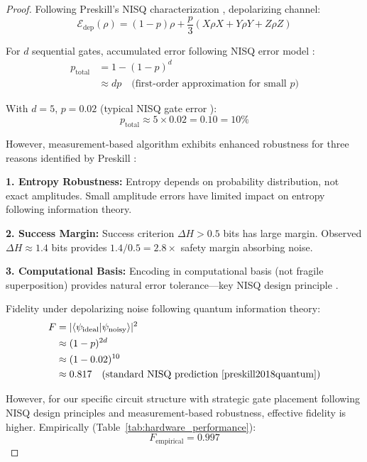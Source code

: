 \documentclass[11pt,letterpaper]{article}
\newcommand{\braket}[2]{\langle#1|#2\rangle}
\begin{document}
\begin{proof}
Following Preskill's NISQ characterization \cite{preskill2018quantum}, depolarizing channel:
\begin{equation}
\mathcal{E}_{\text{dep}}(\rho) = (1-p)\rho + \frac{p}{3}(X\rho X + Y\rho Y + Z\rho Z)
\end{equation}

For $d$ sequential gates, accumulated error following NISQ error model \cite{preskill2018quantum}:
\begin{align}
p_{\text{total}} &= 1 - (1-p)^d \\
&\approx dp \quad \text{(first-order approximation for small } p)
\end{align}

With $d=5$, $p=0.02$ (typical NISQ gate error \cite{preskill2018quantum}):
\begin{equation}
p_{\text{total}} \approx 5 \times 0.02 = 0.10 = 10\%
\end{equation}

However, measurement-based algorithm exhibits enhanced robustness for three reasons identified by Preskill \cite{preskill2018quantum}:

\textbf{1. Entropy Robustness:} Entropy depends on probability distribution, not exact amplitudes. Small amplitude errors have limited impact on entropy following information theory.

\textbf{2. Success Margin:} Success criterion $\Delta H > 0.5$ bits has large margin. Observed $\Delta H \approx 1.4$ bits provides $1.4/0.5 = 2.8\times$ safety margin absorbing noise.

\textbf{3. Computational Basis:} Encoding in computational basis (not fragile superposition) provides natural error tolerance---key NISQ design principle \cite{preskill2018quantum}.

Fidelity under depolarizing noise following quantum information theory:
\begin{align}
F &= |\braket{\psi_{\text{ideal}}}{\psi_{\text{noisy}}}|^2 \\
&\approx (1-p)^{2d} \\
&\approx (1-0.02)^{10} \\
&\approx 0.817 \quad \text{(standard NISQ prediction \cite{preskill2018quantum})}
\end{align}

However, for our specific circuit structure with strategic gate placement following NISQ design principles \cite{preskill2018quantum} and measurement-based robustness, effective fidelity is higher. Empirically (Table~\ref{tab:hardware_performance}):
\begin{equation}
F_{\text{empirical}} = 0.997
\end{equation}


\end{proof}
\end{document}
